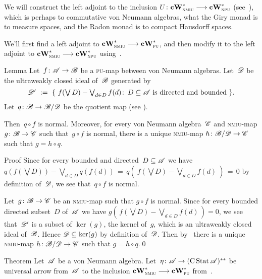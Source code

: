 \documentclass[main]{subfiles}
\begin{document}
\begin{parsec}%
\begin{point}%
We will construct the left adjoint
to the inclusion $U\colon \mathbf{cW}^*_{\text{\textsc{nmiu}}}\longrightarrow \mathbf{cW}^*_{\text{\textsc{npu}}}$
(see~),
which 
is perhaps to commutative von Neumann algebras,
what the Giry monad is to  measure spaces,
and the Radon monad is to compact Hausdorff spaces.

We'll first find a left adjoint to $\mathbf{cW}^*_{\text{\textsc{nmiu}}}\longrightarrow \mathbf{cW}^*_{\text{\textsc{pu}}}$,
and then modify it
to the left adjoint to $\mathbf{cW}^*_{\text{\textsc{nmiu}}}\longrightarrow \mathbf{cW}^*_{\text{\textsc{npu}}}$
using~.
\end{point}
\begin{point}{Lemma}%
Let~$f\colon \mathscr{A}\to\mathscr{B}$
be a \textsc{pu}-map between
von Neumann algebras.
Let~$\mathscr{D}$ be the ultraweakly closed ideal of~$\mathscr{B}$
generated by
\begin{equation*}
\textstyle
\mathscr{D}' \ :=\ \{\ f(\bigvee D)-\bigvee_{d\in D}f(d)\colon \, 
D\subseteq \mathscr{A}\text{ is directed and bounded}\ \}.
\end{equation*}
Let~$q\colon \mathscr{B}\to \mathscr{B}/\mathscr{D}$ be the quotient
map (see ).

Then~$q\circ f$ is normal.
Moreover,
for every von Neumann algebra~$\mathscr{C}$
and \textsc{nmiu}-map $g\colon \mathscr{B}\to \mathscr{C}$
such that~$g\circ f$ is normal,
there is a unique \textsc{nmiu}-map $h\colon \mathscr{B}/\mathscr{D}\to \mathscr{C}$
such that $g=h \circ q$.
\begin{point}{Proof}%
Since for every bounded and directed~$D\subseteq \mathscr{A}$
we have
$q(f(\bigvee D)) - \bigvee_{d\in D}q(f(d))
\,=\, q(\ f(\bigvee D)-\bigvee_{d\in D}f(d)\ ) \,=\, 0$
by definition of~$\mathscr{D}$,
we see that~$q\circ f$ is normal.
\end{point}
\begin{point}%
Let~$g\colon \mathscr{B}\to \mathscr{C}$ be an \textsc{nmiu}-map
such that $g\circ f$ is normal.
Since for every bounded directed subset~$D$ of~$\mathscr{A}$
we have $g(\,f(\bigvee D)-\bigvee_{d\in D}f(d)\,)=0$,
we see that~$\mathscr{D}'$ is a subset of $\ker(g)$, the kernel of~$g$,
which is an ultraweakly closed ideal of~$\mathscr{B}$.
Hence $\mathscr{D}\subseteq \ker(g)$ by definition of~$\mathscr{D}$.
Then by~
there is a unique \textsc{nmiu}-map $h\colon \mathscr{B}/\mathscr{D}\to \mathscr{C}$
such that $g=h\circ q$.\qed
\end{point}
\end{point}
\begin{point}[cw-giry]{Theorem}%
Let~$\mathscr{A}$ be a von Neumann algebra.
Let~$\eta\colon\mathscr{A}\to (\operatorname{C}\operatorname{Stat}\mathscr{A})^{**}$
be universal arrow from~$\mathscr{A}$ to
the inclusion $\mathbf{cW}^*_{\text{\textsc{nmiu}}}\longrightarrow \mathbf{cW}^*_{\text{\textsc{pu}}}$
from~.


\end{point}
\end{parsec}
\end{document}
